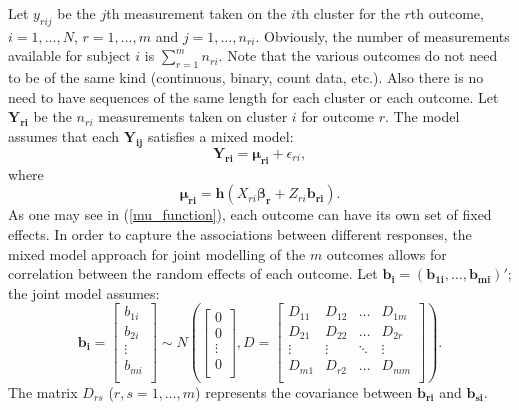 \documentclass[11pt,a5paper,twoside]{book}
\begin{document}
Let $y_{rij}$ be the $j$th measurement taken on the $i$th cluster for the $r$th outcome, $i=1,\ldots,N$, $r=1,\ldots,m$ and $j=1,\ldots,n_{ri}$. Obviously, the number of measurements available for subject $i$ is $\sum_{r=1}^m n_{ri}$. Note that the various outcomes do not need to be of the same kind (continuous, binary, count data, etc.). Also there is no need to have sequences of the same length for each cluster or each outcome. Let $\mathbf{Y_{ri}}$ be the $n_{ri}$ measurements taken on cluster $i$ for outcome $r$. The model assumes that each $\mathbf{Y_{ij}}$ satisfies a mixed model:
\begin{equation}
\label{mixed_model}
\mathbf{Y_{ri}} = \boldsymbol{\mu_{ri}} + \epsilon_{ri},
\end{equation}
where
\begin{equation}
\label{mu_function}
\mathbf{\mu_{ri}} = \mathbf{h}(X_{ri} \boldsymbol{\beta_r} + Z_{ri} \mathbf{b_{ri}}).
\end{equation}
As one may see in (\ref{mu_function}), each outcome can have its own set of fixed effects. In order to capture the associations between different responses, the mixed model approach for joint modelling of the $m$ outcomes allows for correlation between the random effects of each outcome. Let $\mathbf{b_i} = (\mathbf{b_{1i}},\ldots,\mathbf{b_{mi}})'$; the joint model assumes:
\begin{equation}
\label{random_effect_dist}
\mathbf{b_i}=
\begin{bmatrix}
b_{1i} \\
b_{2i}\\
\vdots\\
b_{mi}\\
\end{bmatrix} \sim N \left ( 
\begin{bmatrix}
0 \\
0\\
\vdots\\
0\\
\end{bmatrix}, 
D=\begin{bmatrix}
D_{11} & D_{12} & \ldots & D_{1m}\\
D_{21} & D_{22} & \ldots & D_{2r}\\
\vdots & \vdots & \ddots & \vdots\\
D_{m1} & D_{r2} & \ldots & D_{mm}\\
\end{bmatrix}
\right).
\end{equation}
The matrix $D_{rs}$ ($r,s=1,\ldots,m$) represents the covariance between $\mathbf{b_{ri}}$ and $\mathbf{b_{si}}$. 
\end{document}
